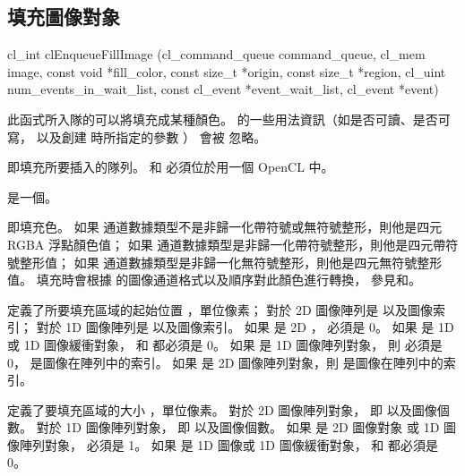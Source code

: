 \subsection{填充圖像對象}


\startCLFUNC
cl_int clEnqueueFillImage (cl_command_queue command_queue,
			cl_mem image,
			const void *fill_color,
			const size_t *origin,
			const size_t *region,
			cl_uint num_events_in_wait_list,
			const cl_event *event_wait_list,
			cl_event *event)
\stopCLFUNC

此函式所入隊的可以將填充成某種顏色。
 的一些用法資訊（如是否可讀、是否可寫，
以及創建  時所指定的參數 ）
會被  忽略。

 即填充所要插入的隊列。
 和  必須位於用一個 OpenCL 中。

 是一個。

 即填充色。
如果  通道數據類型不是非歸一化帶符號或無符號整形，則他是四元 RGBA 浮點顏色值；
如果  通道數據類型是非歸一化帶符號整形，則他是四元帶符號整形值；
如果  通道數據類型是非歸一化無符號整形，則他是四元無符號整形值。
填充時會根據  的圖像通道格式以及順序對此顏色進行轉換，
參見和。

 定義了所要填充區域的起始位置 ，單位像素；
對於 2D 圖像陣列是  以及圖像索引；
對於 1D 圖像陣列是  以及圖像索引。
如果  是 2D ，  必須是 0。
如果  是 1D  或 1D 圖像緩衝對象，
 和  都必須是 0。
如果  是 1D 圖像陣列對象，
則  必須是 0，  是圖像在陣列中的索引。
如果  是 2D 圖像陣列對象，則  是圖像在陣列中的索引。

 定義了要填充區域的大小 ，單位像素。
對於 2D 圖像陣列對象， 即  以及圖像個數。
對於 1D 圖像陣列對象， 即  以及圖像個數。
如果  是 2D 圖像對象 或 1D 圖像陣列對象，  必須是 1。
如果  是 1D 圖像或 1D 圖像緩衝對象，
 和  都必須是 0。

